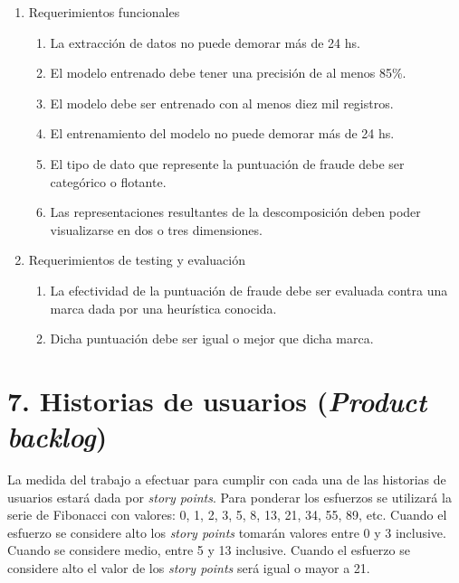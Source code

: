 \documentclass[
11pt, %
]{charter}
\begin{document}
\begin{enumerate}
	\item Requerimientos funcionales
		\begin{enumerate}
			\item La extracción de datos no puede demorar más de 24 hs.
			\item El modelo entrenado debe tener una precisión de al menos 85\%.
			\item El modelo debe ser entrenado con al menos diez mil registros.
			\item El entrenamiento del modelo no puede demorar más de 24 hs.
			\item El tipo de dato que represente la puntuación de fraude debe ser categórico o flotante.
			\item Las representaciones resultantes de la descomposición deben poder visualizarse en dos o tres dimensiones.
		\end{enumerate}
	\item Requerimientos de testing y evaluación
		\begin{enumerate}
			\item La efectividad de la puntuación de fraude debe ser evaluada contra una marca dada por una heurística conocida.
			\item Dicha puntuación debe ser igual o mejor que dicha marca.
		\end{enumerate}
\end{enumerate}

\section{7. Historias de usuarios (\textit{Product backlog})}
\label{sec:backlog}
La medida del trabajo a efectuar para cumplir con cada una de las historias de usuarios estará dada por \emph{story points}. Para ponderar los esfuerzos se utilizará la serie de Fibonacci con valores: 0, 1, 2, 3, 5, 8, 13, 21, 34, 55, 89, etc. Cuando el esfuerzo se considere alto los \emph{story points} tomarán valores entre 0 y 3 inclusive. Cuando se considere medio, entre 5 y 13 inclusive. Cuando el esfuerzo se considere alto el valor de los \emph{story points} será igual o mayor a 21.
\end{document}
